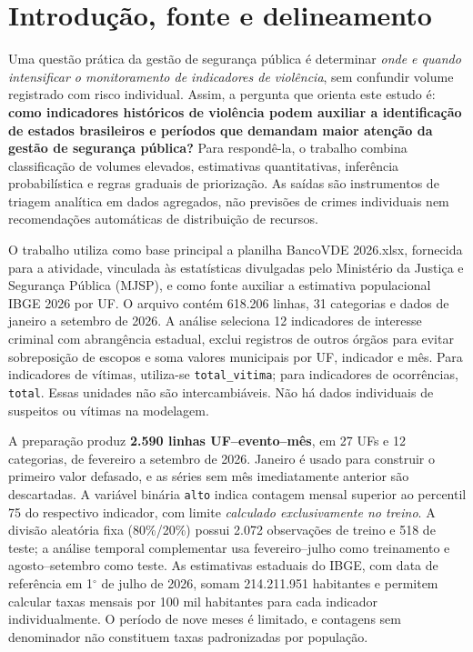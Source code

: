 \documentclass[12pt,a4paper]{article}
\begin{document}
\section{Introdução, fonte e delineamento}
Uma questão prática da gestão de segurança pública é determinar \emph{onde e quando intensificar o monitoramento de indicadores de violência}, sem confundir volume registrado com risco individual. Assim, a pergunta que orienta este estudo é: \textbf{como indicadores históricos de violência podem auxiliar a identificação de estados brasileiros e períodos que demandam maior atenção da gestão de segurança pública?} Para respondê-la, o trabalho combina classificação de volumes elevados, estimativas quantitativas, inferência probabilística e regras graduais de priorização. As saídas são instrumentos de triagem analítica em dados agregados, não previsões de crimes individuais nem recomendações automáticas de distribuição de recursos.

O trabalho utiliza como base principal a planilha BancoVDE 2026.xlsx, fornecida para a atividade, vinculada às estatísticas divulgadas pelo Ministério da Justiça e Segurança Pública (MJSP), e como fonte auxiliar a estimativa populacional IBGE 2026 por UF. O arquivo contém 618.206 linhas, 31 categorias e dados de janeiro a setembro de 2026. A análise seleciona 12 indicadores de interesse criminal com abrangência estadual, exclui registros de outros órgãos para evitar sobreposição de escopos e soma valores municipais por UF, indicador e mês. Para indicadores de vítimas, utiliza-se \texttt{total\_vitima}; para indicadores de ocorrências, \texttt{total}. Essas unidades não são intercambiáveis. Não há dados individuais de suspeitos ou vítimas na modelagem.

A preparação produz \textbf{2.590 linhas UF--evento--mês}, em 27 UFs e 12 categorias, de fevereiro a setembro de 2026. Janeiro é usado para construir o primeiro valor defasado, e as séries sem mês imediatamente anterior são descartadas. A variável binária \texttt{alto} indica contagem mensal superior ao percentil 75 do respectivo indicador, com limite \emph{calculado exclusivamente no treino}. A divisão aleatória fixa (80\%/20\%) possui 2.072 observações de treino e 518 de teste; a análise temporal complementar usa fevereiro--julho como treinamento e agosto--setembro como teste. As estimativas estaduais do IBGE, com data de referência em 1$^{\circ}$ de julho de 2026, somam 214.211.951 habitantes e permitem calcular taxas mensais por 100 mil habitantes para cada indicador individualmente. O período de nove meses é limitado, e contagens sem denominador não constituem taxas padronizadas por população.
\end{document}
